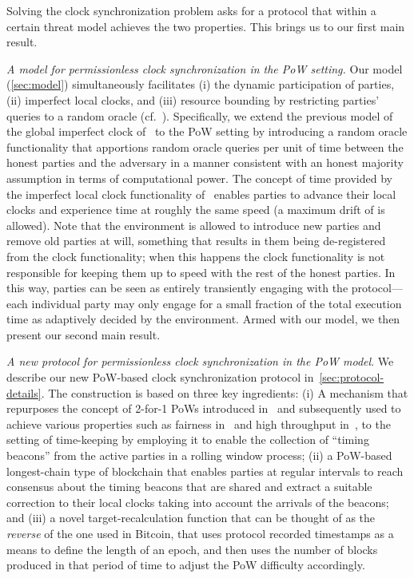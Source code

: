 Solving the clock synchronization problem asks for a protocol that within a certain threat model achieves the two properties.
%
This brings us to our first main result.

\smallskip\noindent\emph{A model for permissionless clock synchronization in the PoW setting.}
%
Our model (\cref{sec:model}) simultaneously facilitates (i) the dynamic participation of parties, (ii) imperfect local clocks, and (iii) resource bounding by restricting parties' queries to a random oracle (cf.~\cite{EC:GKOPZ20}).
%
Specifically, we extend the previous model of the global imperfect clock of~\cite{EC:BGKRZ21} to the PoW setting by introducing a random oracle functionality that apportions random oracle queries per unit of time between the honest parties and the adversary in a manner consistent with an honest majority assumption in terms of computational power.
%
The concept of time provided by the imperfect local clock functionality of~\cite{EC:BGKRZ21} enables parties to advance their local clocks and experience time at roughly the same speed (a maximum drift of \maxdrift is allowed).
%
Note that the environment is allowed to introduce new parties and remove old parties at will, something that results in them being de-registered from the clock functionality; when this happens the clock functionality is not responsible for keeping them up to speed with the rest of the honest parties.
%
In this way, parties can be seen as entirely transiently engaging with the protocol---each individual party may only engage for a small fraction of the total execution time as adaptively decided by the environment.
%
Armed with our model, we then present our second main result.

\smallskip\noindent\emph{A new protocol for permissionless clock synchronization in the PoW model}.
%
We describe our new PoW-based clock synchronization protocol \timekeeper in~\cref{sec:protocol-details}.
%
The construction is based on three key ingredients:
%
(i) A mechanism that repurposes the concept of 2-for-1 PoWs introduced in~\cite{EC:GarKiaLeo15} and subsequently used to achieve various properties such as fairness in~\cite{PODC:PasShi17} and high throughput in~\cite{CCS:BKTFV19}, to the setting of time-keeping by employing it to enable the collection of ``timing beacons'' from the active parties in a rolling window process;
%
(ii) a PoW-based longest-chain type of blockchain that enables parties at regular intervals to reach consensus about the timing beacons that are shared and extract a suitable correction to their local clocks taking into account the arrivals of the beacons;
%
and (iii) a novel target-recalculation function that can be thought of as the \emph{reverse} of the one used in Bitcoin,  that uses protocol recorded timestamps as a means to define the length of an epoch, and then uses the number of blocks produced in that period of time to adjust the PoW difficulty accordingly.

